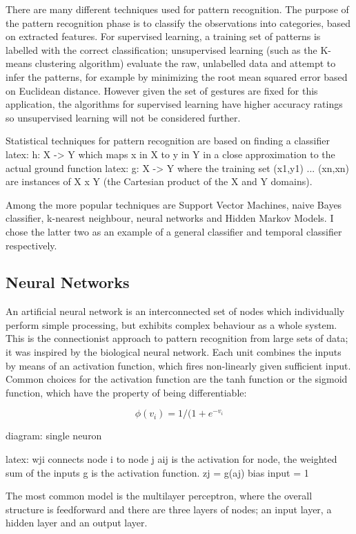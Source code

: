 \documentclass[12pt,a4,notitlepage]{report}
\renewcommand{\_}{\texttt{\symbol{95}}}
\newcommand{\<}{\texttt{\symbol{60}}}
\renewcommand{\>}{\texttt{\symbol{62}}}
\begin{document}
There are many different techniques used for pattern recognition. The purpose of the pattern recognition phase is to classify the observations into categories, based on extracted features. For supervised learning, a training set of patterns is labelled with the correct classification; unsupervised learning (such as the K-means clustering algorithm) evaluate the raw, unlabelled data and attempt to infer the patterns, for example by minimizing the root mean squared error based on Euclidean distance. However given the set of gestures are fixed for this application, the algorithms for supervised learning have higher accuracy ratings so unsupervised learning will not be considered further.

Statistical techniques for pattern recognition are based on finding a classifier
{latex: 
h: X -> Y
}
which maps x in X to y in Y in a close approximation to the actual ground function
{latex: 
g: X -> Y
}
where the training set {(x1,y1) ... (xn,xn)} are instances of X x Y (the Cartesian product of the X and Y domains).

Among the more popular techniques are Support Vector Machines, naive Bayes classifier, k-nearest neighbour, neural networks and Hidden Markov Models. I chose the latter two as an example of a general classifier and temporal classifier respectively.

\subsection{Neural Networks}

An artificial neural network is an interconnected set of nodes which individually perform simple processing, but exhibits complex behaviour as a whole system. This is the connectionist approach to pattern recognition from large sets of data; it was inspired by the biological neural network. Each unit combines the inputs by means of an activation function, which fires non-linearly given sufficient input. Common choices for the activation function are the tanh function or the sigmoid function, which have the property of being differentiable:

\[ \phi(v_i) = 1/(1+e^{-v_i} \]

{diagram: single neuron}

{latex:
wji connects node i to node j
aij is the activation for node, the weighted sum of the inputs
g is the activation function. 
zj = g(aj)
bias input = 1
}

The most common model is the multilayer perceptron, where the overall structure is feedforward and there are three layers of nodes; an input layer, a hidden layer and an output layer. 
\end{document}
